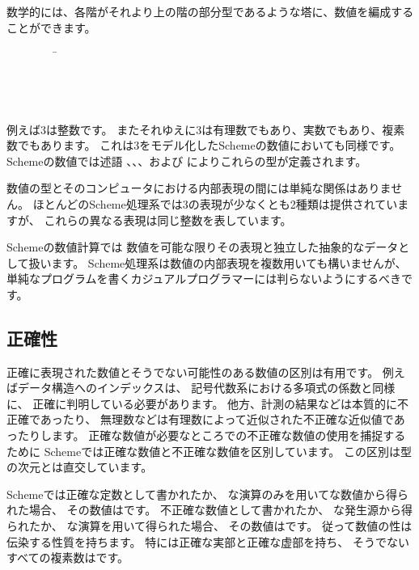 \vest 数学的には、各階がそれより上の階の部分型であるような塔に、数値を編成することができます。
\begin{tabbing}
\ \ \ \ \ \ \ \ \ \= \\
\>  \\
\>  \\
\>  \\
\>  
\end{tabbing}

例えば3は整数です。
またそれゆえに3は有理数でもあり、実数でもあり、複素数でもあります。
これは3をモデル化したSchemeの数値においても同様です。
Schemeの数値では述語
、、、および
によりこれらの型が定義されます。

数値の型とそのコンピュータにおける内部表現の間には単純な関係はありません。
ほとんどのScheme処理系では3の表現が少なくとも2種類は提供されていますが、
これらの異なる表現は同じ整数を表しています。

Schemeの数値計算では
数値を可能な限りその表現と独立した抽象的なデータとして扱います。
Scheme処理系は数値の内部表現を複数用いても構いませんが、
単純なプログラムを書くカジュアルプログラマーには判らないようにするべきです。

\subsection{正確性}

 \label{exactly}

正確に表現された数値とそうでない可能性のある数値の区別は有用です。
例えばデータ構造へのインデックスは、
記号代数系における多項式の係数と同様に、
正確に判明している必要があります。
他方、計測の結果などは本質的に不正確であったり、
無理数などは有理数によって近似された不正確な近似値であったりします。
正確な数値が必要なところでの不正確な数値の使用を捕捉するために
Schemeでは正確な数値と不正確な数値を区別しています。
この区別は型の次元とは直交しています。

Schemeでは正確な定数として書かれたか、
な演算のみを用いてな数値から得られた場合、
その数値はです。
不正確な数値として書かれたか、
な発生源から得られたか、
な演算を用いて得られた場合、
その数値はです。
従って数値の性は伝染する性質を持ちます。
特には正確な実部と正確な虚部を持ち、
そうでないすべての複素数はです。

